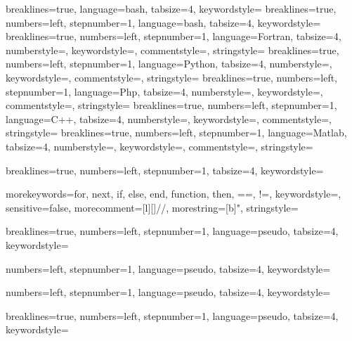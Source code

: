 \usepackage{listings}




{
  breaklines=true,
  language=bash,
  tabsize=4,
  keywordstyle=\color{red}
}
{
  breaklines=true,
  numbers=left,
  stepnumber=1,
  language=bash,
  tabsize=4,
  keywordstyle=\color{red}
}
{
  breaklines=true,
  numbers=left,
  stepnumber=1,
  language=Fortran,
  tabsize=4,
  numberstyle=\tiny\color{gray},
  keywordstyle=\color{blue},
  commentstyle=\color{dkgreen},
  stringstyle=\color{mauve}
}
{
  breaklines=true,
	numbers=left,
	stepnumber=1,
	language=Python,
	tabsize=4,
	numberstyle=\tiny\color{gray},
	keywordstyle=\color{blue},
	commentstyle=\color{dkgreen},
	stringstyle=\color{mauve}
}
{
  breaklines=true,
	numbers=left,
	stepnumber=1,
	language=Php,
	tabsize=4,
	numberstyle=\tiny\color{gray},
	keywordstyle=\color{blue},
	commentstyle=\color{dkgreen},
	stringstyle=\color{mauve}
}
{
  breaklines=true,
	numbers=left,
	stepnumber=1,
	language=C++,
	tabsize=4,
	numberstyle=\tiny\color{gray},
	keywordstyle=\color{blue},
	commentstyle=\color{dkgreen},
	stringstyle=\color{mauve}
}
{
  breaklines=true,
	numbers=left,
	stepnumber=1,
	language=Matlab,
	tabsize=4,
	numberstyle=\tiny\color{gray},
	keywordstyle=\color{blue},
	commentstyle=\color{dkgreen},
	stringstyle=\color{mauve}
}



{
  breaklines=true,
  numbers=left,
  stepnumber=1,
  tabsize=4,
  keywordstyle=\color{blue}
}




{morekeywords={for, next, if, else, end, function, then, ==, !=},
  keywordstyle=\color{codeblue},
  sensitive=false,
  morecomment=[l][\color{codegreen}]{//},
  morestring=[b]",
  stringstyle=\color{redstrings}
}

{
  breaklines=true,
  numbers=left,
  stepnumber=1,
  language=pseudo,
  tabsize=4,
  keywordstyle=\color{blue}
}


{
}

{
  numbers=left,
  stepnumber=1,
  language=pseudo,
  tabsize=4,
  keywordstyle=\color{black}
}


{
  numbers=left,
  stepnumber=1,
  language=pseudo,
  tabsize=4,
  keywordstyle=\color{black}
}


{
  breaklines=true,
  numbers=left,
  stepnumber=1,
  language=pseudo,
  tabsize=4,
  keywordstyle=\color{black}
}



